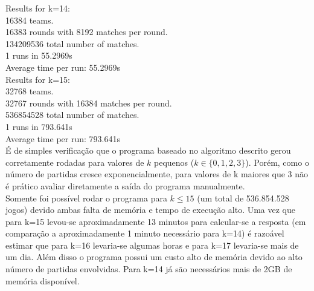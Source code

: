 \documentclass[twoside]{article}
\begin{document}
\begin{multicols}{2}
{\color[rgb]{0,0,1}Results for k=14:}\\
\hspace*{5mm}16384 teams.\\
\hspace*{5mm}16383 rounds with 8192 matches per round.\\
\hspace*{5mm}134209536 total number of matches.\\
\hspace*{5mm}1 runs in 55.2969s\\
\hspace*{5mm}Average time per run: {\color[rgb]{0.7,0.3,0}55.2969s}\\

{\color[rgb]{0,0,1}Results for k=15:}\\
\hspace*{5mm}32768 teams.\\
\hspace*{5mm}32767 rounds with 16384 matches per round.\\
\hspace*{5mm}536854528 total number of matches.\\
\hspace*{5mm}1 runs in 793.641s\\
\hspace*{5mm}Average time per run: {\color[rgb]{0.7,0.3,0}793.641s}\\

É de simples verificação que o programa baseado no algoritmo descrito gerou corretamente rodadas para valores de $k$ pequenos ($k \in \{0,1,2,3\}$). Porém, como o número de partidas cresce exponencialmente, para valores de k maiores que 3 não é prático avaliar diretamente a saída do programa manualmente.\\

Somente foi possível rodar o programa para $k \leq 15$ (um total de 536.854.528 jogos) devido ambas falta de memória e tempo de execução alto. Uma vez que para k=15 levou-se aproximadamente 13 minutos para calcular-se a resposta (em comparação a aproximadamente 1 minuto necessário para k=14) é razoável estimar que para k=16 levaria-se algumas horas e para k=17 levaria-se mais de um dia. Além disso o programa possui um custo alto de memória devido ao alto número de partidas envolvidas. Para k=14 já são necessários mais de 2GB de memória disponível.\\


\newpage

\end{multicols}
\end{document}
